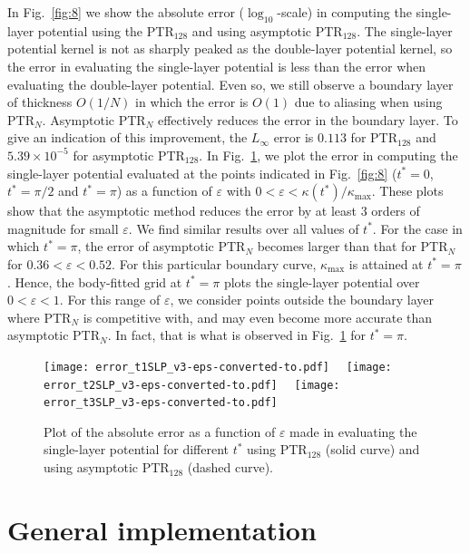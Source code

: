 \documentclass{article}[12pt]
\renewcommand{\epsilon}{\varepsilon}
\numberwithin{equation}{section}
\begin{document}
In {Fig.}~\ref{fig:8} we show the absolute error
  ($\log_{10}$-scale) in computing the single-layer potential using
the PTR$_{128}$ and using asymptotic
PTR$_{128}$.  The single-layer potential kernel is
not as sharply peaked as the double-layer potential kernel, so the
error in evaluating the single-layer potential is less than the error
when evaluating the double-layer potential. Even so, we still observe
a boundary layer of thickness $O(1/N)$ in which the error is $O(1)$
due to aliasing when using PTR$_{N}$. Asymptotic
PTR$_{N}$ effectively reduces the error in the
boundary layer. To give an indication of this improvement, the
$L_{\infty}$ error is $0.113$ for PTR$_{128}$ and
$5.39 \times 10^{-5}$ for asymptotic PTR$_{128}$.  In
Fig.~\ref{fig:9}, we plot the error in computing the single-layer
potential evaluated at the points indicated in Fig.~\ref{fig:8}
($t^{\ast} = 0$, $t^{\ast} = \pi/2$ and $t^{\ast} = \pi$) as a
function of $\epsilon$ with
$0 < \epsilon < \kappa(t^{\ast})/\kappa_{\max}$.  These plots show
that the asymptotic method reduces the error by at least 3 orders of
magnitude for small $\epsilon$. We find similar results over all
values of $t^{\ast}$.  For the case in which $t^{\ast} = \pi$, the
error of asymptotic PTR$_{N}$ becomes larger than
that for PTR$_{N}$ for $0.36 < \epsilon < 0.52$. For
this particular boundary curve, $\kappa_{\max}$ is attained at
$t^{\ast} = \pi$.  Hence, the body-fitted grid at $t^{\ast} = \pi$
plots the single-layer potential over $0 < \epsilon < 1$. For this
range of $\epsilon$, we consider points outside the boundary layer
where PTR$_{N}$ is competitive with, and may even
become more accurate than asymptotic PTR$_{N}$. In
fact, that is what is observed in Fig.~\ref{fig:9} for
$t^{\ast} = \pi$.

\begin{figure}[h!]
  \centering
  \texttt{[image: error\_t1SLP\_v3-eps-converted-to.pdf]} \, \, 
  \texttt{[image: error\_t2SLP\_v3-eps-converted-to.pdf]} \, \, 
  \texttt{[image: error\_t3SLP\_v3-eps-converted-to.pdf]} \, \, 
  \caption{Plot of the absolute error as a function of $\epsilon$ made
    in evaluating the single-layer potential for different $t^\ast$
    using PTR$_{128}$ (solid curve) and using
    asymptotic PTR$_{128}$ (dashed curve).}
    \label{fig:9}
\end{figure}

\section{General implementation}
\label{sec:implementation}
\end{document}

